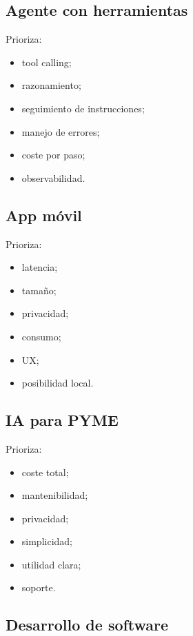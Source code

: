 \subsection{Agente con herramientas}\label{agente-con-herramientas}

Prioriza:

\begin{itemize}
\tightlist
\item
  tool calling;
\item
  razonamiento;
\item
  seguimiento de instrucciones;
\item
  manejo de errores;
\item
  coste por paso;
\item
  observabilidad.
\end{itemize}

\subsection{App móvil}\label{app-muxf3vil}

Prioriza:

\begin{itemize}
\tightlist
\item
  latencia;
\item
  tamaño;
\item
  privacidad;
\item
  consumo;
\item
  UX;
\item
  posibilidad local.
\end{itemize}

\subsection{IA para PYME}\label{ia-para-pyme}

Prioriza:

\begin{itemize}
\tightlist
\item
  coste total;
\item
  mantenibilidad;
\item
  privacidad;
\item
  simplicidad;
\item
  utilidad clara;
\item
  soporte.
\end{itemize}

\subsection{Desarrollo de software}\label{desarrollo-de-software}

